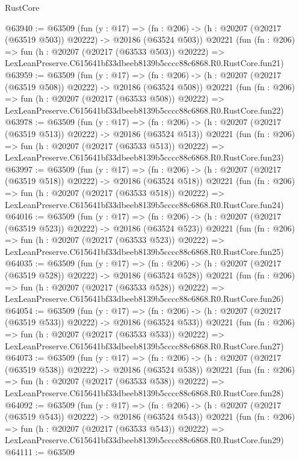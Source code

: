 \begin{lexlean}{RustCore}
\begin{coremodule}
@63940 := @63509
    (fun (y : @17) =>
    (fn : @206) -> (h : @20207 (@20217 (@63519 @503)) @20222) -> @20186 (@63524 @503))
    @20221
    (fun (fn : @206) =>
    fun (h : @20207 (@20217 (@63533 @503)) @20222) =>
    LexLeanPreserve.C615641bf33dbeeb8139b5cccc88c6868.R0.RustCore.fun21)
@63959 := @63509
    (fun (y : @17) =>
    (fn : @206) -> (h : @20207 (@20217 (@63519 @508)) @20222) -> @20186 (@63524 @508))
    @20221
    (fun (fn : @206) =>
    fun (h : @20207 (@20217 (@63533 @508)) @20222) =>
    LexLeanPreserve.C615641bf33dbeeb8139b5cccc88c6868.R0.RustCore.fun22)
@63978 := @63509
    (fun (y : @17) =>
    (fn : @206) -> (h : @20207 (@20217 (@63519 @513)) @20222) -> @20186 (@63524 @513))
    @20221
    (fun (fn : @206) =>
    fun (h : @20207 (@20217 (@63533 @513)) @20222) =>
    LexLeanPreserve.C615641bf33dbeeb8139b5cccc88c6868.R0.RustCore.fun23)
@63997 := @63509
    (fun (y : @17) =>
    (fn : @206) -> (h : @20207 (@20217 (@63519 @518)) @20222) -> @20186 (@63524 @518))
    @20221
    (fun (fn : @206) =>
    fun (h : @20207 (@20217 (@63533 @518)) @20222) =>
    LexLeanPreserve.C615641bf33dbeeb8139b5cccc88c6868.R0.RustCore.fun24)
@64016 := @63509
    (fun (y : @17) =>
    (fn : @206) -> (h : @20207 (@20217 (@63519 @523)) @20222) -> @20186 (@63524 @523))
    @20221
    (fun (fn : @206) =>
    fun (h : @20207 (@20217 (@63533 @523)) @20222) =>
    LexLeanPreserve.C615641bf33dbeeb8139b5cccc88c6868.R0.RustCore.fun25)
@64035 := @63509
    (fun (y : @17) =>
    (fn : @206) -> (h : @20207 (@20217 (@63519 @528)) @20222) -> @20186 (@63524 @528))
    @20221
    (fun (fn : @206) =>
    fun (h : @20207 (@20217 (@63533 @528)) @20222) =>
    LexLeanPreserve.C615641bf33dbeeb8139b5cccc88c6868.R0.RustCore.fun26)
@64054 := @63509
    (fun (y : @17) =>
    (fn : @206) -> (h : @20207 (@20217 (@63519 @533)) @20222) -> @20186 (@63524 @533))
    @20221
    (fun (fn : @206) =>
    fun (h : @20207 (@20217 (@63533 @533)) @20222) =>
    LexLeanPreserve.C615641bf33dbeeb8139b5cccc88c6868.R0.RustCore.fun27)
@64073 := @63509
    (fun (y : @17) =>
    (fn : @206) -> (h : @20207 (@20217 (@63519 @538)) @20222) -> @20186 (@63524 @538))
    @20221
    (fun (fn : @206) =>
    fun (h : @20207 (@20217 (@63533 @538)) @20222) =>
    LexLeanPreserve.C615641bf33dbeeb8139b5cccc88c6868.R0.RustCore.fun28)
@64092 := @63509
    (fun (y : @17) =>
    (fn : @206) -> (h : @20207 (@20217 (@63519 @543)) @20222) -> @20186 (@63524 @543))
    @20221
    (fun (fn : @206) =>
    fun (h : @20207 (@20217 (@63533 @543)) @20222) =>
    LexLeanPreserve.C615641bf33dbeeb8139b5cccc88c6868.R0.RustCore.fun29)
@64111 := @63509

\end{coremodule}
\end{lexlean}
